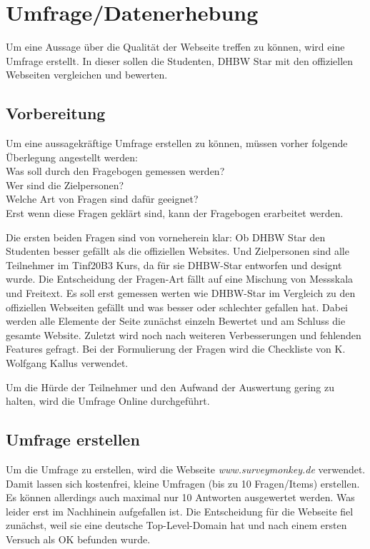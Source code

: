 \chapter{Umfrage/Datenerhebung}
Um eine Aussage über die Qualität der Webseite treffen zu können, wird eine Umfrage erstellt. In dieser sollen die Studenten, DHBW Star mit den offiziellen Webseiten vergleichen und bewerten.

\section{Vorbereitung}
Um eine aussagekräftige Umfrage erstellen zu können, müssen vorher folgende Überlegung angestellt werden:\\
Was soll durch den Fragebogen gemessen werden?\\
Wer sind die Zielpersonen?\\
Welche Art von Fragen sind dafür geeignet?\\
Erst wenn diese Fragen geklärt sind, kann der Fragebogen erarbeitet werden.

Die ersten beiden Fragen sind von vorneherein klar:
Ob DHBW Star den Studenten besser gefällt als die offiziellen Websites.
Und Zielpersonen sind alle Teilnehmer im Tinf20B3 Kurs, da für sie DHBW-Star entworfen und designt wurde.
Die Entscheidung der Fragen-Art fällt auf eine Mischung von Messskala und Freitext. Es soll erst gemessen werten wie DHBW-Star im Vergleich zu den offiziellen Webseiten gefällt und was besser oder schlechter gefallen hat.
Dabei werden alle Elemente der Seite zunächst einzeln Bewertet und am Schluss die gesamte Website.
Zuletzt wird noch nach weiteren Verbesserungen und fehlenden Features gefragt.
Bei der Formulierung der Fragen wird die Checkliste von K. Wolfgang Kallus verwendet.
\cite{fragebogenKallus}

Um die Hürde der Teilnehmer und den Aufwand der Auswertung gering zu halten, wird die Umfrage Online durchgeführt.

\section{Umfrage erstellen}
Um die Umfrage zu erstellen, wird die Webseite \emph{www.surveymonkey.de} verwendet. Damit lassen sich kostenfrei, kleine Umfragen (bis zu 10 Fragen/Items) erstellen. Es können allerdings auch maximal nur 10 Antworten ausgewertet werden. Was leider erst im Nachhinein aufgefallen ist.
Die Entscheidung für die Webseite fiel zunächst, weil sie eine deutsche Top-Level-Domain hat und nach einem ersten Versuch als OK befunden wurde.

